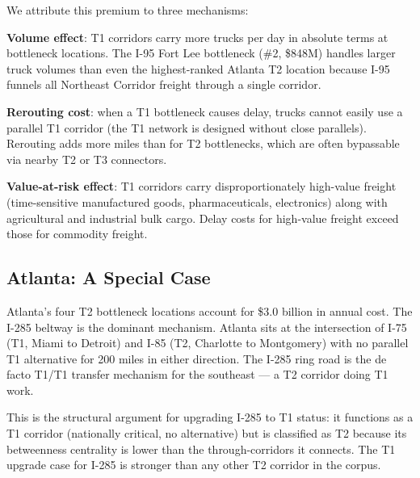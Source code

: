 We attribute this premium to three mechanisms:

\textbf{Volume effect}: T1 corridors carry more trucks per day in absolute terms at bottleneck locations. The I-95 Fort Lee bottleneck (\#2, \$848M) handles larger truck volumes than even the highest-ranked Atlanta T2 location because I-95 funnels all Northeast Corridor freight through a single corridor.

\textbf{Rerouting cost}: when a T1 bottleneck causes delay, trucks cannot easily use a parallel T1 corridor (the T1 network is designed without close parallels). Rerouting adds more miles than for T2 bottlenecks, which are often bypassable via nearby T2 or T3 connectors.

\textbf{Value-at-risk effect}: T1 corridors carry disproportionately high-value freight (time-sensitive manufactured goods, pharmaceuticals, electronics) along with agricultural and industrial bulk cargo. Delay costs for high-value freight exceed those for commodity freight.

\subsection{Atlanta: A Special Case}

Atlanta's four T2 bottleneck locations account for \$3.0 billion in annual cost. The I-285 beltway is the dominant mechanism. Atlanta sits at the intersection of I-75 (T1, Miami to Detroit) and I-85 (T2, Charlotte to Montgomery) with no parallel T1 alternative for 200 miles in either direction. The I-285 ring road is the de facto T1/T1 transfer mechanism for the southeast --- a T2 corridor doing T1 work.

This is the structural argument for upgrading I-285 to T1 status: it functions as a T1 corridor (nationally critical, no alternative) but is classified as T2 because its betweenness centrality is lower than the through-corridors it connects. The T1 upgrade case for I-285 is stronger than any other T2 corridor in the corpus.
